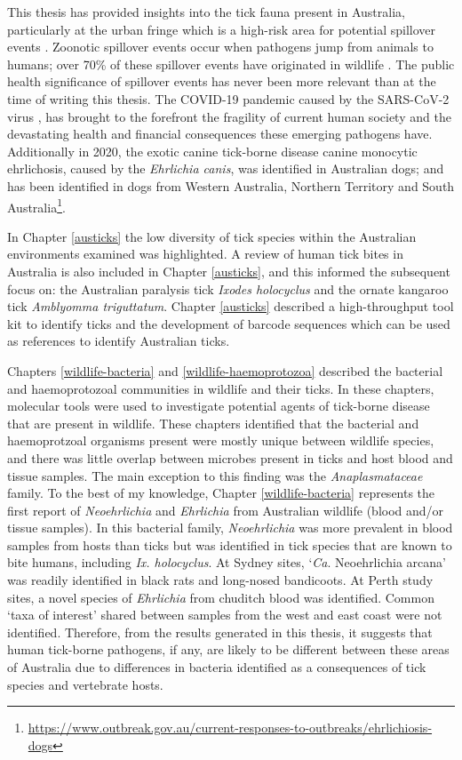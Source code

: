 \documentclass[a4paper, nobind]{templates/ociamthesis}
\begin{document}
This thesis has provided insights into the tick fauna present in Australia, particularly at the urban fringe which is a high-risk area for potential spillover events \autocite{plowrightLandUseinducedSpillover2021}.
Zoonotic spillover events occur when pathogens jump from animals to humans; over 70\% of these spillover events have originated in wildlife \autocite{jonesGlobalTrendsEmerging2008}.
The public health significance of spillover events has never been more relevant than at the time of writing this thesis.
The COVID-19 pandemic caused by the SARS-CoV-2 virus \autocite{luGenomicCharacterisationEpidemiology2020a}, has brought to the forefront the fragility of current human society and the devastating health and financial consequences these emerging pathogens have.
Additionally in 2020, the exotic canine tick-borne disease canine monocytic ehrlichosis, caused by the \emph{Ehrlichia canis}, was identified in Australian dogs; and has been identified in dogs from Western Australia, Northern Territory and South Australia\footnote{\url{https://www.outbreak.gov.au/current-responses-to-outbreaks/ehrlichiosis-dogs}}.

In Chapter \ref{austicks} the low diversity of tick species within the Australian environments examined was highlighted.
A review of human tick bites in Australia is also included in Chapter \ref{austicks}, and this informed the subsequent focus on: the Australian paralysis tick \emph{Ixodes holocyclus} and the ornate kangaroo tick \emph{Amblyomma triguttatum}.
Chapter \ref{austicks} described a high-throughput tool kit to identify ticks and the development of barcode sequences which can be used as references to identify Australian ticks.

Chapters \ref{wildlife-bacteria} and \ref{wildlife-haemoprotozoa} described the bacterial and haemoprotozoal communities in wildlife and their ticks.
In these chapters, molecular tools were used to investigate potential agents of tick-borne disease that are present in wildlife.
These chapters identified that the bacterial and haemoprotzoal organisms present were mostly unique between wildlife species, and there was little overlap between microbes present in ticks and host blood and tissue samples.
The main exception to this finding was the \emph{Anaplasmataceae} family.
To the best of my knowledge, Chapter \ref{wildlife-bacteria} represents the first report of \emph{Neoehrlichia} and \emph{Ehrlichia} from Australian wildlife (blood and/or tissue samples).
In this bacterial family, \emph{Neoehrlichia} was more prevalent in blood samples from hosts than ticks but was identified in tick species that are known to bite humans, including \emph{Ix. holocyclus}.
At Sydney sites, `\emph{Ca}. Neoehrlichia arcana' was readily identified in black rats and long-nosed bandicoots.
At Perth study sites, a novel species of \emph{Ehrlichia} from chuditch blood was identified. Common `taxa of interest' shared between samples from the west and east coast were not identified.
Therefore, from the results generated in this thesis, it suggests that human tick-borne pathogens, if any, are likely to be different between these areas of Australia due to differences in bacteria identified as a consequences of tick species and vertebrate hosts.
\end{document}
